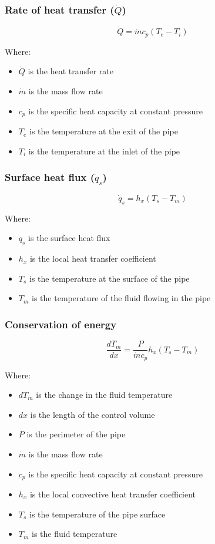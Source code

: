 \documentclass[11pt]{article}
\begin{document}
\subsubsection{Rate of heat transfer (\(\dot{Q}\))}
\label{sec:orgf0baa32}
\[\dot{Q} = \dot{m} c_p (T_e - T_i)\]

Where:
\begin{itemize}
\item \(\dot{Q}\) is the heat transfer rate
\item \(\dot{m}\) is the mass flow rate
\item \(c_p\) is the specific heat capacity at constant pressure
\item \(T_e\) is the temperature at the exit of the pipe
\item \(T_i\) is the temperature at the inlet of the pipe
\end{itemize}
\subsubsection{Surface heat flux (\(\dot{q}_s\))}
\label{sec:orge6bc676}
\[\dot{q}_s = h_x (T_s - T_m)\]

Where:
\begin{itemize}
\item \(\dot{q}_s\) is the surface heat flux
\item \(h_x\) is the local heat transfer coefficient
\item \(T_s\) is the temperature at the surface of the pipe
\item \(T_m\) is the temperature of the fluid flowing in the pipe
\end{itemize}
\subsubsection{Conservation of energy}
\label{sec:orgac0307b}
\[\frac{dT_m}{dx} = \frac{P}{\dot{m} c_p} h_x (T_s - T_m)\]

Where:
\begin{itemize}
\item \(dT_m\) is the change in the fluid temperature
\item \(dx\) is the length of the control volume
\item \(P\) is the perimeter of the pipe
\item \(\dot{m}\) is the mass flow rate
\item \(c_p\) is the specific heat capacity at constant pressure
\item \(h_x\) is the local convective heat transfer coefficient
\item \(T_s\) is the temperature of the pipe surface
\item \(T_m\) is the fluid temperature
\end{itemize}
\end{document}
